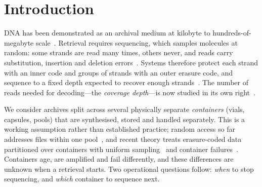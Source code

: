 \documentclass[acmsmall,screen]{acmart}
\begin{document}


\maketitle
\pagestyle{acmplain}\thispagestyle{acmplain}

\section{Introduction}
DNA has been demonstrated as an archival medium at kilobyte to hundreds-of-megabyte
scale~\cite{church2012next,goldman2013towards,grass2015robust,erlich2017fountain,organick2018random}.
Retrieval requires sequencing, which samples molecules at random: some strands are read
many times, others never, and reads carry substitution, insertion and deletion
errors~\cite{heckel2019characterization,gimpel2023digital}.  Systems therefore protect each
strand with an inner code and groups of strands with an outer erasure code, and sequence to a
fixed depth expected to recover enough strands~\cite{grass2015robust,organick2018random}.  The
number of reads needed for decoding---the \emph{coverage depth}---is now studied in its own
right~\cite{barlev2025cover,gruica2024combinatorial}.

We consider archives split across several physically separate \emph{containers} (vials,
capsules, pools) that are synthesised, stored and handled separately.  This is a working
assumption rather than established practice; random access so far addresses files within one
pool~\cite{bornholt2016dna,organick2018random}, and recent theory treats erasure-coded data
partitioned over containers with uniform sampling~\cite{kong2026coverage} and container
failures~\cite{levy2026expected}.  Containers age, are amplified and fail differently, and
these differences are unknown when a retrieval starts.  Two operational questions follow:
\emph{when} to stop sequencing, and \emph{which} container to sequence next.
\end{document}
